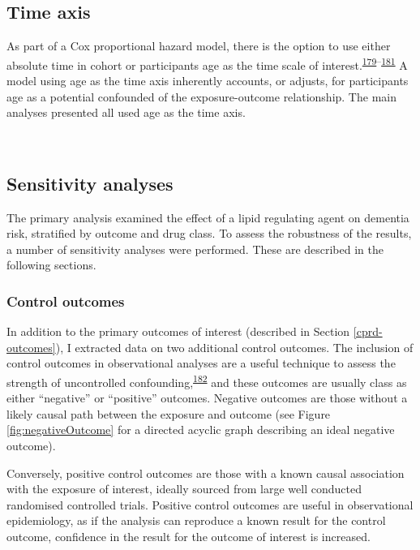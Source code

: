 \documentclass[a4paper, twoside]{templates/ociamthesis}
\begin{document}
\hypertarget{time-axis}{%
\subsection{Time axis}\label{time-axis}}

As part of a Cox proportional hazard model, there is the option to use either absolute time in cohort or participants age as the time scale of interest.\textsuperscript{\protect\hyperlink{ref-lamarca1998}{179}--\protect\hyperlink{ref-pencina2007}{181}} A model using age as the time axis inherently accounts, or adjusts, for participants age as a potential confounded of the exposure-outcome relationship. The main analyses presented all used age as the time axis.

~

\hypertarget{sensitivity-analyses-1}{%
\subsection{Sensitivity analyses}\label{sensitivity-analyses-1}}

The primary analysis examined the effect of a lipid regulating agent on dementia risk, stratified by outcome and drug class. To assess the robustness of the results, a number of sensitivity analyses were performed. These are described in the following sections.

\hypertarget{control-outcomes}{%
\subsubsection{Control outcomes}\label{control-outcomes}}

In addition to the primary outcomes of interest (described in Section \ref{cprd-outcomes}), I extracted data on two additional control outcomes. The inclusion of control outcomes in observational analyses are a useful technique to assess the strength of uncontrolled confounding,\textsuperscript{\protect\hyperlink{ref-lipsitch2010}{182}} and these outcomes are usually class as either ``negative'' or ``positive'' outcomes. Negative outcomes are those without a likely causal path between the exposure and outcome (see Figure \ref{fig:negativeOutcome} for a directed acyclic graph describing an ideal negative outcome).

Conversely, positive control outcomes are those with a known causal association with the exposure of interest, ideally sourced from large well conducted randomised controlled trials. Positive control outcomes are useful in observational epidemiology, as if the analysis can reproduce a known result for the control outcome, confidence in the result for the outcome of interest is increased.
\end{document}
